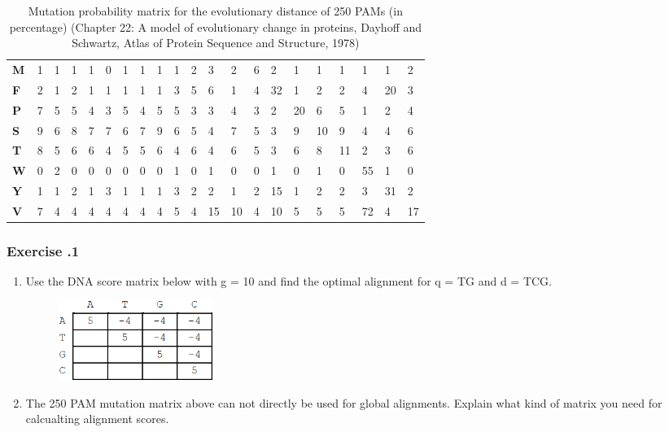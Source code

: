 \begin{table}[!ht]
\begin{tabular}{lllllllllllllllllllll}
\textbf{M} & 1   & 1   & 1   & 1   & 0   & 1   & 1   & 1   & 1   & 2   & 3   & 2   & 6   & 2   & 1   & 1   & 1   & 1   & 1   & 2   \\
\textbf{F} & 2   & 1   & 2   & 1   & 1   & 1   & 1   & 1   & 3   & 5   & 6   & 1   & 4   & 32  & 1   & 2   & 2   & 4   & 20  & 3   \\
\textbf{P} & 7   & 5   & 5   & 4   & 3   & 5   & 4   & 5   & 5   & 3   & 3   & 4   & 3   & 2   & 20  & 6   & 5   & 1   & 2   & 4   \\
\textbf{S} & 9   & 6   & 8   & 7   & 7   & 6   & 7   & 9   & 6   & 5   & 4   & 7   & 5   & 3   & 9   & 10  & 9   & 4   & 4   & 6   \\
\textbf{T} & 8   & 5   & 6   & 6   & 4   & 5   & 5   & 6   & 4   & 6   & 4   & 6   & 5   & 3   & 6   & 8   & 11  & 2   & 3   & 6   \\
\textbf{W} & 0   & 2   & 0   & 0   & 0   & 0   & 0   & 0   & 1   & 0   & 1   & 0   & 0   & 1   & 0   & 1   & 0   & 55  & 1   & 0   \\
\textbf{Y} & 1   & 1   & 2   & 1   & 3   & 1   & 1   & 1   & 3   & 2   & 2   & 1   & 2   & 15  & 1   & 2   & 2   & 3   & 31  & 2   \\
\textbf{V} & 7   & 4   & 4   & 4   & 4   & 4   & 4   & 4   & 5   & 4   & 15  & 10  & 4   & 10  & 5   & 5   & 5   & 72  & 4   & 17 
\end{tabular}
\caption{Mutation probability matrix for the evolutionary distance of 250 PAMs (in percentage) (Chapter 22: A model of evolutionary change in proteins, Dayhoff and Schwartz, Atlas of Protein Sequence and Structure, 1978)}
\end{table}

%
%
\subsubsection*{Exercise \thesection.1}
\begin{enumerate}
\item Use the DNA score matrix below with g = 10 and find the optimal alignment for q = TG and d = TCG.

\begin{figure}[H]
  \centering
      \includegraphics[width=0.25\textwidth]{fig03/dna_matrix_exercise.png}
\end{figure}

\item The 250 PAM mutation matrix above can not directly be used for global alignments. Explain what kind of matrix you need for calcualting alignment scores.
\end{enumerate}

\bigskip 

%

